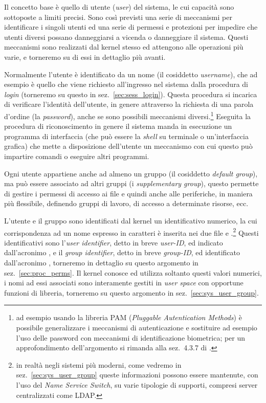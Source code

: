 Il concetto base è quello di utente (\textit{user}) del sistema, le cui
capacità sono sottoposte a limiti precisi.  Sono così previsti una serie di
meccanismi per identificare i singoli utenti ed una serie di permessi e
protezioni per impedire che utenti diversi possano danneggiarsi a vicenda o
danneggiare il sistema. Questi meccanismi sono realizzati dal kernel stesso ed
attengono alle operazioni più varie, e torneremo su di essi in dettaglio più
avanti.

Normalmente l'utente è identificato da un nome (il cosiddetto
\textit{username}), che ad esempio è quello che viene richiesto all'ingresso
nel sistema dalla procedura di \textit{login} (torneremo su questo in
sez.~\ref{sec:sess_login}).  Questa procedura si incarica di verificare
l'identità dell'utente, in genere attraverso la richiesta di una parola
d'ordine (la \textit{password}), anche se sono possibili meccanismi
diversi.\footnote{ad esempio usando la libreria PAM (\textit{Pluggable
    Autentication Methods}) è possibile generalizzare i meccanismi di
  autenticazione e sostituire ad esempio l'uso delle password con meccanismi
  di identificazione biometrica; per un approfondimento dell'argomento si
  rimanda alla sez.~4.3.7 di \cite{AGL}.} Eseguita la procedura di
riconoscimento in genere il sistema manda in esecuzione un programma di
interfaccia (che può essere la \textit{shell} su terminale o un'interfaccia
grafica) che mette a disposizione dell'utente un meccanismo con cui questo può
impartire comandi o eseguire altri programmi.

Ogni utente appartiene anche ad almeno un gruppo (il cosiddetto
\textit{default group}), ma può essere associato ad altri gruppi (i
\textit{supplementary group}), questo permette di gestire i permessi di
accesso ai file e quindi anche alle periferiche, in maniera più flessibile,
definendo gruppi di lavoro, di accesso a determinate risorse, ecc. 

L'utente e il gruppo sono identificati dal kernel un identificativo numerico,
la cui corrispondenza ad un nome espresso in caratteri è inserita nei due file
 e .\footnote{in realtà negli
  sistemi più moderni, come vedremo in sez.~\ref{sec:sys_user_group} queste
  informazioni possono essere mantenute, con l'uso del \textit{Name Service
    Switch}, su varie tipologie di supporti, compresi server centralizzati
  come LDAP.}  Questi identificativi sono l'\textit{user identifier}, detto in
breve \textsl{user-ID}, ed indicato dall'acronimo , e il
\textit{group identifier}, detto in breve \textsl{group-ID}, ed identificato
dall'acronimo , torneremo in dettaglio su questo argomento in
sez.~\ref{sec:proc_perms}.  Il kernel conosce ed utilizza soltanto questi
valori numerici, i nomi ad essi associati sono interamente gestiti in
\textit{user space} con opportune funzioni di libreria, torneremo su questo
argomento in sez.~\ref{sec:sys_user_group}.
 
